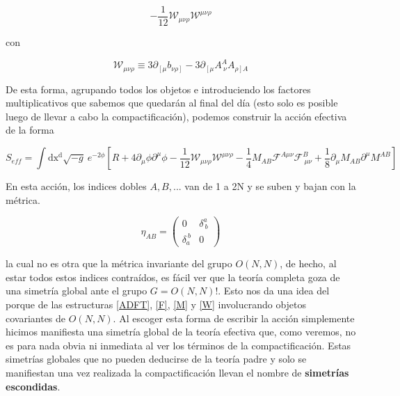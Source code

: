 \documentclass{article}
\numberwithin{equation}{section}
\begin{document}
\begin{equation}
- \frac{1}{12} \mathcal{W}_{\mu \nu \rho} \mathcal{W}^{\mu \nu \rho}
\end{equation}

con

\begin{equation}\label{W}
\mathcal{W}_{\mu \nu \rho} \equiv 3\partial_{\left[\mu\right.} b_{\left.\nu \rho\right]} - 3\partial_{\left[\mu\right.}A^A_{\ \nu}A_{\left.\rho\right] A}
\end{equation}

De esta forma, agrupando todos los objetos e introduciendo los factores multiplicativos que sabemos que quedarán al final del día (esto solo es posible luego de llevar a cabo la compactificación), podemos construir la acción efectiva de la forma


\begin{equation}\label{S_compact}
S_{eff}=\int\mathrm{dx^d} \sqrt{-g} \ e^{-2\phi}\left[R + 4 \partial_{\mu}\phi\partial^{\mu} \phi - \frac{1}{12} \mathcal{W}_{\mu \nu \rho} \mathcal{W}^{\mu \nu \rho} -\frac{1}{4} M_{A B} \mathcal{F}^{A \mu \nu} \mathcal{F}^B_{\ \mu \nu} + \frac{1}{8} \partial_{\mu} M_{A B} \partial^{\mu} M^{A B}\right] 
\end{equation}


En esta acción, los indices dobles $ A,B,... $ van de 1 a 2N y se suben y bajan con la métrica.

\begin{equation}\label{eta}
\eta_{A B} = \begin{pmatrix}
0 & \delta^a_{\ b}\\
\delta_a^{\ b} & 0
\end{pmatrix}
\end{equation}

la cual no es otra que la métrica invariante del grupo $ O(N,N) $, de hecho, al estar todos estos indices contraídos, es fácil ver que la teoría completa goza de una simetría global ante el grupo $ G= O(N,N) $!. Esto nos da una idea del porque de las estructuras \ref{ADFT}, \ref{F}, \ref{M} y \ref{W} involucrando objetos covariantes de $ O(N,N) $. Al escoger esta forma de escribir la acción simplemente hicimos manifiesta una simetría global de la teoría efectiva que, como veremos, no es para nada obvia ni inmediata al ver los términos de la compactificación. Estas simetrías globales que no pueden deducirse de la teoría padre y solo se manifiestan una vez realizada la compactificación llevan el nombre de \textbf{simetrías escondidas}.
\end{document}
